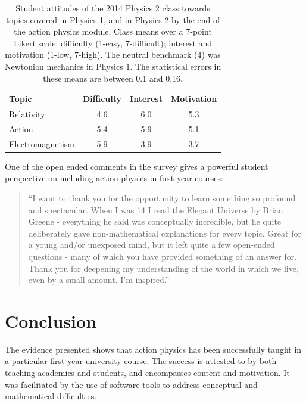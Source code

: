 \documentclass[prb,oncolumn]{revtex4-2}
\begin{document}
\begin{table}[t]
\centering
\caption{Student attitudes of the 2014 Physics 2 class towards topics covered in Physics 1, and in Physics 2 by the end of the action physics module. Class means over a 7-point Likert scale: difficulty (1-easy, 7-difficult); interest and motivation (1-low, 7-high). The neutral benchmark (4) was Newtonian mechanics in Physics 1. The statistical errors in these means are between 0.1 and 0.16.}
\begin{ruledtabular}
\begin{tabular}{l c c c }
Topic & Difficulty & Interest & Motivation \\
\hline	%
Relativity & 4.6 & 6.0 & 5.3  \\
Action & 5.4 & 5.9 & 5.1 \\
Electromagnetism & 5.9 & 3.9 & 3.7 \\
\end{tabular}
\end{ruledtabular}
\label{bosons}
\end{table}


One of the open ended comments in the survey gives a powerful student perspective on including action physics in first-year courses:
\begin{quote}
``I want to thank you for the opportunity to learn something so profound and spectacular. When I was 14 I read the Elegant Universe by Brian Greene - everything he said was conceptually incredible, but he quite deliberately gave non-mathematical explanations for every topic. Great for a young and/or unexposed mind, but it left quite a few open-ended questions - many of which you have provided something of an answer for. Thank you for deepening my understanding of the world in which we live, even by a small amount. I'm inspired.'' 
\end{quote}


\section{Conclusion}
\label{Conclusion}

The evidence presented shows that action physics has been successfully taught in a particular first-year university course. The success is attested to by both teaching academics and students, and encompasses content and motivation. It was facilitated by the use of software tools to address conceptual and mathematical difficulties. 
\end{document}
